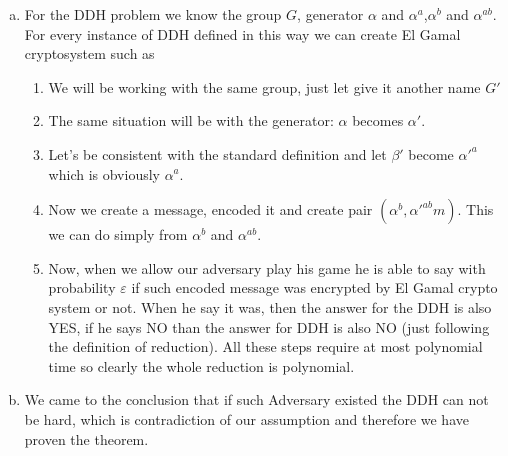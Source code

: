 \documentclass[a4paper,10pt]{article}
\begin{document}
\begin{enumerate}[a)]
\item For the DDH problem we know the group $G$, generator $\alpha$ and $\alpha^a$,$\alpha^b$ and $\alpha^{ab}$. For every instance of DDH defined in this way we can create El Gamal cryptosystem such as
\begin{enumerate}[I]
\item We will be working with the same group, just let give it another name $G'$
\item The same situation will be with the generator: $\alpha$ becomes $\alpha'$.
\item Let's be consistent with the standard definition and let $\beta'$ become $\alpha'^a$ which is obviously $\alpha^a$.
\item Now we create a message, encoded it and create pair $(\alpha^b,\alpha'^{ab}m)$. This we can do simply from $\alpha^b$ and $\alpha^{ab}$.
\item Now, when we allow our adversary play his game he is able to say with probability $\varepsilon$ if such encoded message was encrypted by El Gamal crypto system or not. When he say it was, then the answer for the DDH is also YES, if he says NO than the answer for DDH is also NO (just following the definition of reduction). All these steps require at most polynomial time so clearly the whole reduction is polynomial.
\end{enumerate}
\item We came to the conclusion that if such Adversary existed the DDH can not be hard, which is contradiction of our assumption and therefore we have proven the theorem.
\end{enumerate}
\end{document}
